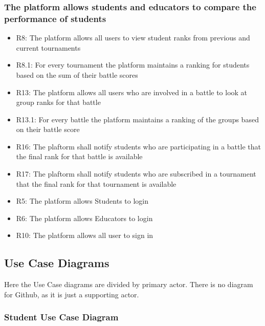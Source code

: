 \subsubsection{The platform allows students and educators to compare the performance of students}

\begin{itemize}
    \item R8: The platform allows all users to view student ranks from previous and current tournaments
    \item R8.1: For every tournament the platform maintains a ranking for students based on the sum of their battle scores
    \item R13: The platform allows all users who are involved in a battle to look at group ranks for that battle
    \item R13.1: For every battle the platform maintains a ranking of the groups based on their battle score
    \item R16: The plaftorm shall notify students who are participating in a battle that the final rank for that battle is available
    \item R17: The plaftorm shall notify students who are subscribed in a tournament that the final rank for that tournament is available
    \item R5: The platform allows Students to login
    \item R6: The platform allows Educators to login
    \item R10: The platform allows all user to sign in
    
\end{itemize}

\subsection{Use Case Diagrams}

Here the Use Case diagrams are divided by primary actor. There is no diagram for Github, as it is just a supporting actor.

\subsubsection{Student Use Case Diagram}


